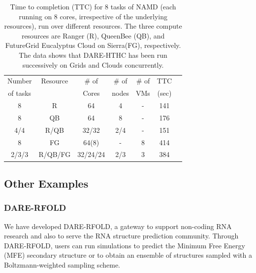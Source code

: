 \documentclass[]{svjour3}
\begin{document}
 \begin{table}
\centering
\small
 \begin{tabular}{|c|c|c|c|c|c|c|} 
 \hline 
 Number           & Resource    & \# of &  \# of     &     \# of     &	TTC  \\
of tasks                &     &  Cores    &nodes&   VMs  & (sec) \\  
\hline
8& R&	64	&4 & - &141\\
\hline                  
8& QB	&	64& 8 &	-&176 \\
\hline
4/4&R/QB	&	32/32 &2/4&-&151\\
\hline
8&FG	&	64(8) & - &8&414 \\
\hline
2/3/3&R/QB/FG	&32/24/24&2/3&	3 &384\\
\hline


\end{tabular}
\caption{Time to completion (TTC) for 8 tasks of NAMD (each running on 8 cores,
  irrespective of the underlying resources), run over different resources. The three
  compute resources are Ranger (R), QueenBee (QB), 
  and  FutureGrid  Eucalyptus Cloud on Sierra(FG), respectively. The
  data shows that DARE-HTHC has been run successively on Grids and
  Clouds concurrently.}
 \label{table:HTHP-Distributed} 
\end{table}

\subsection{Other Examples}
\subsubsection{DARE-RFOLD}

We have developed DARE-RFOLD, a gateway to support non-coding RNA
research and also to serve the RNA structure prediction
community. Through DARE-RFOLD, users can run simulations to predict
the Minimum Free Energy (MFE) secondary structure or to obtain an
ensemble of structures sampled with a Boltzmann-weighted sampling
scheme.

\end{document}
